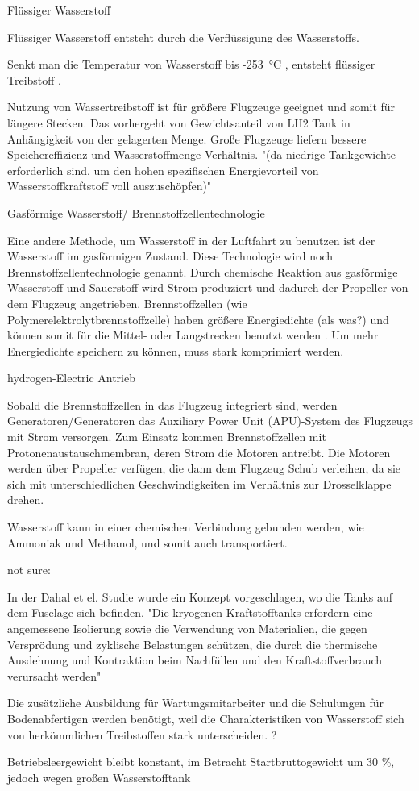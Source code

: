 Flüssiger Wasserstoff

Flüssiger Wasserstoff entsteht durch die Verflüssigung des Wasserstoffs.

Senkt man die Temperatur von Wasserstoff bis -253 °C \cite{colpan2022fuel}, entsteht flüssiger Treibstoff .

Nutzung von Wassertreibstoff ist für größere Flugzeuge geeignet und somit für längere Stecken. Das vorhergeht von 
Gewichtsanteil von LH2 Tank in Anhängigkeit von der gelagerten Menge. 
Große Flugzeuge liefern bessere Speichereffizienz und Wasserstoffmenge-Verhältnis.
"(da niedrige Tankgewichte erforderlich sind, um den hohen spezifischen Energievorteil von Wasserstoffkraftstoff voll auszuschöpfen)"
\cite{ansell2023review}


Gasförmige Wasserstoff/ Brennstoffzellentechnologie

Eine andere Methode, um Wasserstoff in der Luftfahrt zu benutzen ist der Wasserstoff im gasförmigen Zustand. 
Diese Technologie wird noch Brennstoffzellentechnologie genannt.
Durch chemische Reaktion aus gasförmige Wasserstoff  und Sauerstoff  wird Strom produziert \cite{dalmia2022powering} und 
dadurch der Propeller von dem Flugzeug angetrieben.
Brennstoffzellen (wie Polymerelektrolytbrennstoffzelle) haben größere Energiedichte (als was?) und 
können somit für die Mittel- oder Langstrecken benutzt werden \cite{dalmia2022powering}. 
Um mehr Energiedichte speichern zu können, muss  stark komprimiert werden. 

hydrogen-Electric Antrieb

Sobald die Brennstoffzellen in das Flugzeug integriert sind, werden Generatoren/Generatoren das 
Auxiliary Power Unit (APU)-System des Flugzeugs mit Strom versorgen. Zum Einsatz kommen Brennstoffzellen 
mit Protonenaustauschmembran, deren Strom die Motoren antreibt. Die Motoren werden über Propeller verfügen,
die dann dem Flugzeug Schub verleihen, da sie sich mit unterschiedlichen Geschwindigkeiten im Verhältnis zur Drosselklappe drehen.\cite{dalmia2022powering}

Wasserstoff kann in einer chemischen Verbindung gebunden werden, wie Ammoniak und Methanol, und somit auch transportiert.

not sure:

\cite{dahal2021techno} In der Dahal et el. Studie wurde ein Konzept vorgeschlagen, wo die Tanks auf dem Fuselage sich befinden.
"Die kryogenen Kraftstofftanks erfordern eine angemessene Isolierung sowie die Verwendung von Materialien, die 
gegen Versprödung und zyklische Belastungen schützen, die durch die thermische Ausdehnung und Kontraktion beim Nachfüllen 
und den Kraftstoffverbrauch verursacht werden"

Die zusätzliche Ausbildung für Wartungsmitarbeiter und die Schulungen für Bodenabfertigen
werden benötigt, weil die Charakteristiken von Wasserstoff 
sich von herkömmlichen Treibstoffen stark unterscheiden. \cite{mulder2019outlook}?

Betriebsleergewicht bleibt konstant, im Betracht Startbruttogewicht um 30 \%, jedoch wegen großen Wasserstofftank

